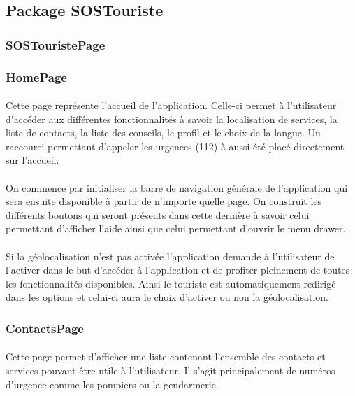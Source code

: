 \subsection{Package SOSTouriste}
	\subsubsection{SOSTouristePage}
	\subsubsection{HomePage}
	\paragraph{}
		Cette page représente l'accueil de l'application. Celle-ci permet à l'utilisateur d'accéder aux différentes fonctionnalités à savoir la localisation de services, la liste de contacts, la liste des conseils, le profil et le choix de la langue. Un raccourci permettant d'appeler les urgences (112) à aussi été placé directement sur l'accueil.
	
	\paragraph{}
	On commence par initialiser la barre de navigation générale de l'application qui sera ensuite disponible à partir de n'importe quelle page. On construit les différents boutons qui seront présents dans cette dernière à savoir celui permettant d'afficher l'aide ainsi que celui permettant d'ouvrir le menu drawer.
	
	\paragraph{}
	Si la géolocalisation n'est pas activée l'application demande à l'utilisateur de l'activer dans le but d'accéder à l'application et de profiter pleinement de toutes les fonctionnalités disponibles. Ainsi le touriste est automatiquement redirigé dans les options et celui-ci aura le choix d'activer ou non la géolocalisation.
	\subsubsection{ContactsPage}
	\paragraph{}
		Cette page permet d'afficher une liste contenant l'ensemble des contacts et services pouvant être utile à l'utilisateur. Il s'agit principalement de numéros d'urgence comme les pompiers ou la gendarmerie.
	
